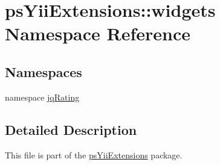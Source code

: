 \hypertarget{namespacepsYiiExtensions_1_1widgets}{
\section{psYiiExtensions::widgets Namespace Reference}
\label{namespacepsYiiExtensions_1_1widgets}
}
\subsection*{Namespaces}
\begin{DoxyCompactItemize}
\item 
namespace \hyperlink{namespacepsYiiExtensions_1_1widgets_1_1jqRating}{jqRating}
\end{DoxyCompactItemize}


\subsection{Detailed Description}
This file is part of the \hyperlink{namespacepsYiiExtensions}{psYiiExtensions} package.

